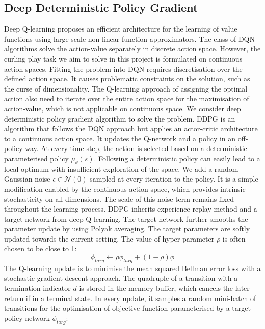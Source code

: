 \documentclass[oneside,11pt,a4paper]{article}
\begin{document}
\subsection{Deep Deterministic Policy Gradient}
Deep Q-learning proposes an efficient architecture for the learning of value functions using large-scale non-linear function approximators. The class of DQN algorithms solve the action-value separately in discrete action space. However, the curling play task we aim to solve in this project is formulated on continuous action spaces. Fitting the problem into DQN requires discretisation over the defined action space. It causes problematic constraints on the solution, such as the curse of dimensionality. The Q-learning approach of assigning the optimal action also need to iterate over the entire action space for the maximisation of action-value, which is not applicable on continuous space.
\newline
\newline
\noindent
We consider deep deterministic policy gradient algorithm to solve the problem. DDPG is an algorithm that follows the DQN approach but applies an actor-critic architecture to a continuous action space. It updates the Q-network and a policy in an off-policy way. At every time step, the action is selected based on a deterministic parameterised policy $\mu_\theta(s)$. Following a deterministic policy can easily lead to a local optimum with insufficient exploration of the space. We add a random Gaussian noise $\epsilon \in \mathcal N(0)$ sampled at every iteration to the policy. It is a simple modification enabled by the continuous action space, which provides intrinsic stochasticity on all dimensions. The scale of this noise term remains fixed throughout the learning process.
\newline
\newline
\noindent
DDPG inherits experience replay method and a target network from deep Q-learning. The target network further smooths the parameter update by using Polyak averaging. The target parameters are softly updated towards the current setting. The value of hyper parameter $\rho$ is often chosen to be close to 1:
$$
\phi_{targ} \leftarrow \rho\phi_{targ} + (1-\rho)\phi
$$
The Q-learning update is to minimise the mean squared Bellman error loss with a stochastic gradient descent approach. The quadruple of a transition with a termination indicator $d$ is stored in the memory buffer, which cancels the later return if in a terminal state. In every update, it samples a random mini-batch of transitions for the optimisation of objective function parameterised by a target policy network $\phi_{targ}$:
\end{document}
